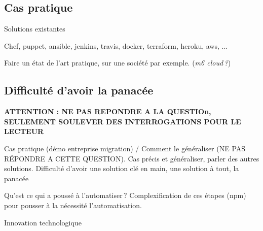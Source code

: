 \subsection{Cas pratique}

Solutions existantes

Chef, puppet, ansible, jenkins, travis, docker, terraform, heroku, aws, ...

Faire un état de l'art pratique, sur une société par exemple. (\textit{m6 cloud ?})

\subsection{Difficulté d'avoir la panacée}

\textbf{ATTENTION : NE PAS REPONDRE A LA QUESTIOn, SEULEMENT SOULEVER DES INTERROGATIONS POUR LE LECTEUR}

Cas pratique (démo entreprise migration) / Comment le généraliser (NE PAS RÉPONDRE A CETTE QUESTION). Cas précis et généraliser, parler des autres solutions. Difficulté d'avoir une solution clé en main, une solution à tout, la panacée


Qu'est ce qui a poussé à l'automatiser ? Complexification de ces étapes (npm) pour pousser à la nécessité l'automatisation.

Innovation technologique 